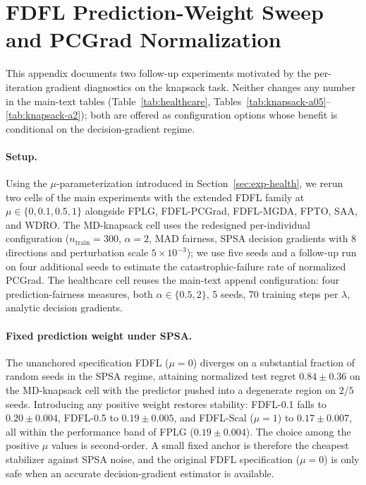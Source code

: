 %

\section{FDFL Prediction-Weight Sweep and PCGrad Normalization}
\label{app:mu-followup}

This appendix documents two follow-up experiments motivated by the
per-iteration gradient diagnostics on the knapsack task. Neither
changes any number in the main-text tables
(Table~\ref{tab:healthcare}, Tables~\ref{tab:knapsack-a05}--\ref{tab:knapsack-a2});
both are offered as configuration options whose benefit is
conditional on the decision-gradient regime.

\paragraph{Setup.}
Using the $\mu$-parameterization introduced in
Section~\ref{sec:exp-health}, we rerun two cells of the main
experiments with the extended FDFL family at $\mu\in\{0,0.1,0.5,1\}$
alongside FPLG, FDFL-PCGrad, FDFL-MGDA, FPTO, SAA, and WDRO. The
MD-knapsack cell uses the redesigned per-individual configuration
($n_{\mathrm{train}} = 300$, $\alpha = 2$, MAD fairness, SPSA
decision gradients with 8 directions and perturbation scale
$5\times 10^{-3}$); we use five seeds and a follow-up run on four
additional seeds to estimate the catastrophic-failure rate of
normalized PCGrad. The healthcare cell reuses the main-text append
configuration: four prediction-fairness measures, both
$\alpha\in\{0.5,2\}$, 5 seeds, 70 training steps per $\lambda$,
analytic decision gradients.

\paragraph{Fixed prediction weight under SPSA.}
The unanchored specification FDFL ($\mu = 0$) diverges on a
substantial fraction of random seeds in the SPSA regime,
attaining normalized test regret $0.84 \pm 0.36$ on the MD-knapsack
cell with the predictor pushed into a degenerate region on
$2/5$ seeds. Introducing any positive weight restores stability:
FDFL-0.1 falls to $0.20 \pm 0.004$, FDFL-0.5 to
$0.19 \pm 0.005$, and FDFL-Scal ($\mu = 1$) to $0.17 \pm 0.007$,
all within the performance band of FPLG
($0.19 \pm 0.004$). The choice among the positive $\mu$ values is
second-order. A small fixed anchor is therefore the cheapest
stabilizer against SPSA noise, and the original FDFL
specification ($\mu = 0$) is only safe when an accurate
decision-gradient estimator is available.

